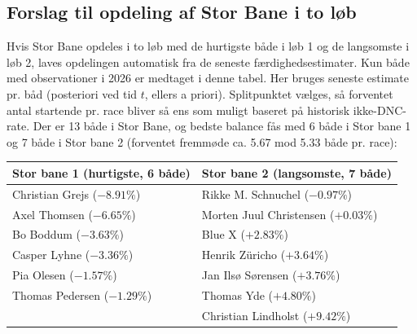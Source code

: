 \subsection*{Forslag til opdeling af Stor Bane i to løb}
Hvis Stor Bane opdeles i to løb med de hurtigste både i løb 1 og de langsomste i løb 2, laves opdelingen automatisk fra de seneste færdighedsestimater.
Kun både med observationer i 2026 er medtaget i denne tabel.
Her bruges seneste estimate pr. båd (posteriori ved tid $t$, ellers a priori). Splitpunktet vælges, så forventet antal startende pr. race bliver så ens som muligt baseret på historisk ikke-DNC-rate.
Der er 13 både i Stor Bane, og bedste balance fås med 6 både i Stor bane 1 og 7 både i Stor bane 2 (forventet fremmøde ca. 5.67 mod 5.33 både pr. race):

\begin{table}[H]
\centering
\begin{tabular}{ll}
\toprule
Stor bane 1 (hurtigste, 6 både) & Stor bane 2 (langsomste, 7 både) \\
\midrule
Christian Grejs (\(-8.91\%\)) & Rikke M. Schnuchel (\(-0.97\%\)) \\
Axel Thomsen (\(-6.65\%\)) & Morten Juul Christensen (\(+0.03\%\)) \\
Bo Boddum (\(-3.63\%\)) & Blue X (\(+2.83\%\)) \\
Casper Lyhne (\(-3.36\%\)) & Henrik Züricho (\(+3.64\%\)) \\
Pia Olesen (\(-1.57\%\)) & Jan Ilsø Sørensen (\(+3.76\%\)) \\
Thomas Pedersen (\(-1.29\%\)) & Thomas Yde (\(+4.80\%\)) \\
 & Christian Lindholst (\(+9.42\%\)) \\
\bottomrule
\end{tabular}
\end{table}